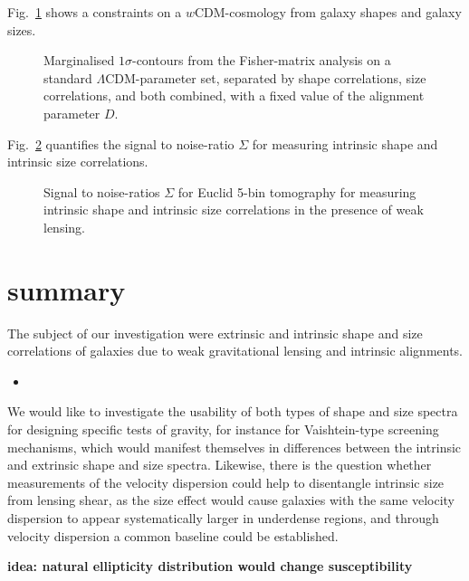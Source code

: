 \documentclass[a4paper,fleqn,usenatbib]{mnras}
\def\spirou#1{{\bf #1}}
\begin{document}
Fig.~\ref{fig:fisher} shows a constraints on a $w$CDM-cosmology from galaxy shapes and galaxy sizes.

\begin{figure}
\centering
\caption{Marginalised $1\sigma$-contours from the Fisher-matrix analysis on a standard $\Lambda$CDM-parameter set, separated by shape correlations, size correlations, and both combined, with a fixed value of the alignment parameter $D$.}
\label{fig:fisher}
\end{figure}

Fig.~\ref{fig:s2n} quantifies the signal to noise-ratio $\Sigma$ for measuring intrinsic shape and intrinsic size correlations.

\begin{figure}
\centering
\caption{Signal to noise-ratios $\Sigma$ for Euclid 5-bin tomography for measuring intrinsic shape and intrinsic size correlations in the presence of weak lensing.}
\label{fig:s2n}
\end{figure}


\section{summary}\label{sect_summary}
The subject of our investigation were extrinsic and intrinsic shape and size correlations of galaxies due to weak gravitational lensing and intrinsic alignments. 
\begin{itemize}
\item{}
\end{itemize}
We would like to investigate the usability of both types of shape and size spectra for designing specific tests of gravity, for instance for Vaishtein-type screening mechanisms, which would manifest themselves in differences between the intrinsic and extrinsic shape and size spectra. Likewise, there is the question whether measurements of the velocity dispersion could help to disentangle intrinsic size from lensing shear, as the size effect would cause galaxies with the same velocity dispersion to appear systematically larger in underdense regions, and through velocity dispersion a common baseline could be established.

\spirou{idea: natural ellipticity distribution would change susceptibility}
\end{document}
